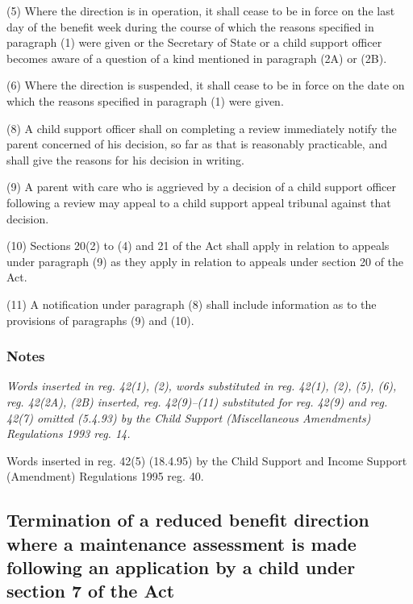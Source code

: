 \documentclass[a4paper]{article}
\newcommand\amendment[1]{\subsubsection*{Notes}{\itshape\frenchspacing\footnotesize #1 \par}}
\begin{document}
(5) Where the direction is in operation, it shall cease to be in force on the last day of the benefit week during the course of which 
the reasons specified in paragraph (1) were given %
or the Secretary of State or a child support officer becomes aware of a question of a kind mentioned in paragraph (2A) or (2B).  %

(6) Where the direction is suspended, it shall cease to be in force on the date on which %
the reasons specified in paragraph (1) were given. %


(8) A child support officer shall on completing a review immediately notify the parent concerned of his decision, so far as that is reasonably practicable, and shall give the reasons for his decision in writing.

(9) A parent with care who is aggrieved by a decision of a child support officer following a review may appeal to a child support appeal tribunal against that decision.

(10) Sections 20(2) to (4) and 21 of the Act shall apply in relation to appeals under paragraph (9) as they apply in relation to appeals under section 20 of the Act.

(11) A notification under paragraph (8) shall include information as to the provisions of paragraphs (9) and (10).

\amendment{
Words inserted in reg. 42(1), (2), words substituted in reg. 42(1), (2), (5), (6), reg. 42(2A), (2B) inserted, reg. 42(9)--(11) substituted for reg. 42(9) and reg. 42(7) omitted (5.4.93) by the Child Support (Miscellaneous Amendments) Regulations 1993 reg. 14.

Words inserted in reg. 42(5) (18.4.95) by the Child Support and Income Support (Amendment) Regulations 1995 reg. 40.
}

\subsection[43. Termination of a reduced benefit direction where a maintenance assessment is made following an application by a child under section 7 of the Act]{Termination of a reduced benefit direction where a maintenance assessment is made following an application by a child under section 7 of the Act}
\end{document}
